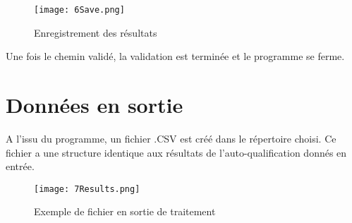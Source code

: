 \begin{figure}[H]
	\centering
	\texttt{[image: 6Save.png]} 
	\caption[Enregistrement des résultats]{Enregistrement des résultats}
	\label{fig:save}
\end{figure}

Une fois le chemin validé, la validation est terminée et le programme se ferme.

\section{Données en sortie}

A l'issu du programme, un fichier .CSV est créé dans le répertoire choisi. Ce fichier a une structure identique aux résultats de l'auto-qualification donnés en entrée.

\begin{figure}[H]
	\centering
	\texttt{[image: 7Results.png]} 
	\caption[Exemple de fichier en sortie de traitement]{Exemple de fichier en sortie de traitement}
	\label{fig:outdata}
\end{figure}



